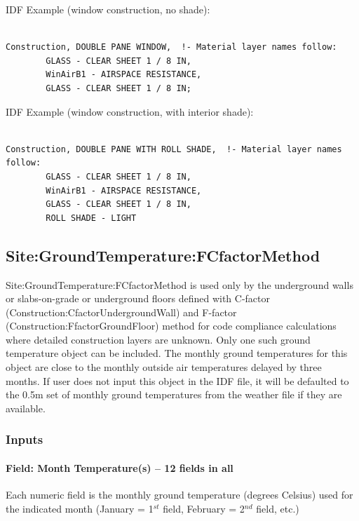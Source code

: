 IDF Example (window construction, no shade):

\begin{lstlisting}

Construction, DOUBLE PANE WINDOW,  !- Material layer names follow:
        GLASS - CLEAR SHEET 1 / 8 IN,
        WinAirB1 - AIRSPACE RESISTANCE,
        GLASS - CLEAR SHEET 1 / 8 IN;
\end{lstlisting}

IDF Example (window construction, with interior shade):

\begin{lstlisting}

Construction, DOUBLE PANE WITH ROLL SHADE,  !- Material layer names follow:
        GLASS - CLEAR SHEET 1 / 8 IN,
        WinAirB1 - AIRSPACE RESISTANCE,
        GLASS - CLEAR SHEET 1 / 8 IN,
        ROLL SHADE - LIGHT
\end{lstlisting}

\subsection{Site:GroundTemperature:FCfactorMethod}\label{sitegroundtemperaturefcfactormethod-000}

Site:GroundTemperature:FCfactorMethod is used only by the underground walls or slabs-on-grade or underground floors defined with C-factor (Construction:CfactorUndergroundWall) and F-factor (Construction:FfactorGroundFloor) method for code compliance calculations where detailed construction layers are unknown. Only one such ground temperature object can be included. The monthly ground temperatures for this object are close to the monthly outside air temperatures delayed by three months. If user does not input this object in the IDF file, it will be defaulted to the 0.5m set of monthly ground temperatures from the weather file if they are available.

\subsubsection{Inputs}\label{inputs-35-000}

\paragraph{Field: Month Temperature(s) -- 12 fields in all}\label{field-month-temperatures-12-fields-in-all-000}

Each numeric field is the monthly ground temperature (degrees Celsius) used for the indicated month (January = 1\(^{st}\) field, February = 2\(^{nd}\) field, etc.)

